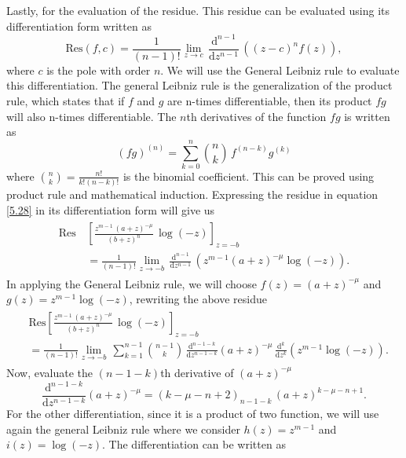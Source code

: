 Lastly, for the evaluation of the residue. This residue can be evaluated using its differentiation form written as
\begin{equation}
    \mathrm{Res}(f, c) = \frac{1}{(n-1)!} \lim_{z \to c} \, \frac{\mathrm{d}^{n-1}}{\mathrm{d}z^{n-1}} \, ((z-c)^{n} f(z)),
    \label{5.28}
\end{equation}
where $c$ is the pole with order $n$. We will use the General Leibniz rule to evaluate this differentiation. The general Leibniz rule is the generalization of the product rule, which states that if $f$ and $g$ are n-times differentiable, then its product $fg$ will also n-times differentiable. The $n$th derivatives of the function $fg$ is written as
\begin{equation}
    (fg)^{(n)} =  \sum_{k=0}^{n} {n \choose k} \, f^{(n-k)} g^{(k)}
\end{equation}
where ${n \choose k} = \frac{n!}{k!(n-k)!}$ is the binomial coefficient. This can be proved using product rule and mathematical induction. Expressing the residue in equation \eqref{5.28} in its differentiation form will give us
\begin{align}
\begin{split}
    \mathrm{Res} \,& \left[\frac{z^{m-1} \, (a+z)^{-\mu}}{(b+z)^{n}}\, \log(-z) \right]_{z=-b} \\& = \frac{1}{(n-1)!} \lim_{z \to -b} \, \frac{\mathrm{d}^{n-1}}{\mathrm{d}z^{n-1}} \, ( z^{m-1 }(a+z)^{-\mu} \log(-z)).
\end{split}
\end{align}
In applying the General Leibniz rule, we will choose $f(z) =  (a+z)^{-\mu}$ and $g(z) = z^{m-1} \log(-z)$, rewriting the above residue
\begin{align}
\begin{split}
   & \mathrm{Res}  \left[\frac{z^{m-1} \, (a+z)^{-\mu}}{(b+z)^{n}}\, \log(-z) \right]_{z=-b} \\& = \frac{1}{(n-1)!} \lim_{z \to -b} \, \sum_{k=1}^{n-1} {n -1 \choose k} \, \frac{\mathrm{d}^{n-1-k}}{\mathrm{d}z^{n-1-k}} (a+z)^{-\mu} \, \frac{\mathrm{d}^{k}}{\mathrm{d}z^{k}}  (z^{m-1 } \log(-z)).
    \label{5.31}
\end{split}
\end{align}
Now, evaluate the $(n-1-k)$th derivative of $(a+z)^{-\mu}$
\begin{equation}
    \frac{\mathrm{d}^{n-1-k}}{\mathrm{d}z^{n-1-k}} (a+z)^{-\mu}= (k-\mu-n+2)_{n-1-k} \, (a+z)^{k-\mu-n+1}.
    \label{5.32}
\end{equation}
For the other differentiation, since it is a product of two function, we will use again the general Leibniz rule where we consider $h(z)=z^{m-1}$ and $i(z) = \log(-z)$. The differentiation can be written as 
